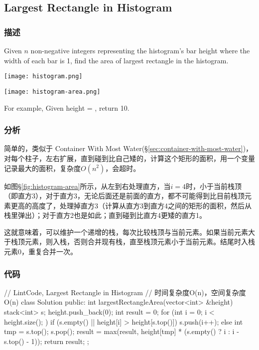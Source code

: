 \subsection{Largest Rectangle in Histogram} %
\label{sec:largest-rectangle-in-histogram}


\subsubsection{描述}
Given $n$ non-negative integers representing the histogram's bar height where the width of each bar is 1, find the area of largest rectangle in the histogram.

\begin{center}
\texttt{[image: histogram.png]}\\
\label{fig:histogram}
\end{center}

\begin{center}
\texttt{[image: histogram-area.png]}\\
\label{fig:histogram-area}
\end{center}

For example,
Given height = \fn{[2,1,5,6,2,3]},
return 10.


\subsubsection{分析}
简单的，类似于 Container With Most Water(\S \ref{sec:container-with-most-water})，对每个柱子，左右扩展，直到碰到比自己矮的，计算这个矩形的面积，用一个变量记录最大的面积，复杂度$O(n^2)$，会超时。

如图\S \ref{fig:histogram-area}所示，从左到右处理直方，当$i=4$时，小于当前栈顶（即直方3），对于直方3，无论后面还是前面的直方，都不可能得到比目前栈顶元素更高的高度了，处理掉直方3（计算从直方3到直方4之间的矩形的面积，然后从栈里弹出）；对于直方2也是如此；直到碰到比直方4更矮的直方1。

这就意味着，可以维护一个递增的栈，每次比较栈顶与当前元素。如果当前元素大于栈顶元素，则入栈，否则合并现有栈，直至栈顶元素小于当前元素。结尾时入栈元素0，重复合并一次。


\subsubsection{代码}
\begin{Code}
// LintCode, Largest Rectangle in Histogram
// 时间复杂度O(n)，空间复杂度O(n)
class Solution {
public:
    int largestRectangleArea(vector<int> &height) {
        stack<int> s;
        height.push_back(0);
        int result = 0;
        for (int i = 0; i < height.size(); ) {
            if (s.empty() || height[i] > height[s.top()])
                s.push(i++);
            else {
                int tmp = s.top();
                s.pop();
                result = max(result,
                        height[tmp] * (s.empty() ? i : i - s.top() - 1));
            }
        }
        return result;
    }
};
\end{Code}


